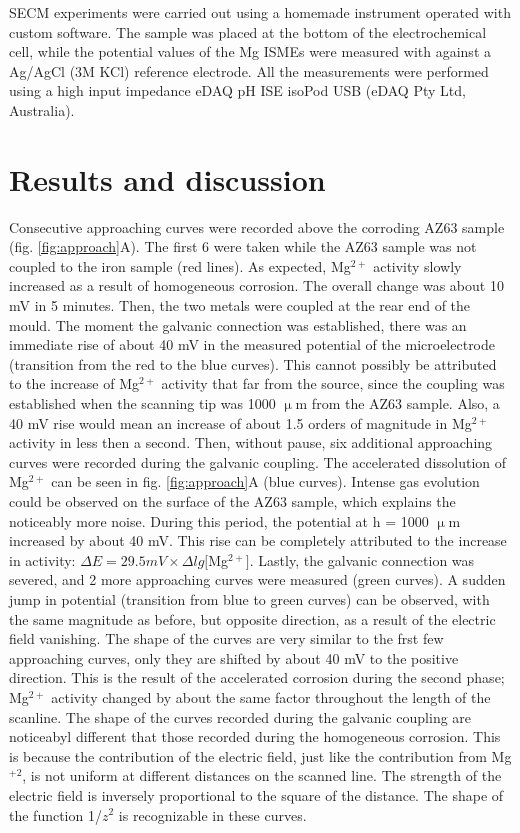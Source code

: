 \documentclass[3p]{elsarticle}
\begin{document}
SECM experiments were carried out using a homemade instrument operated with custom software. The sample was placed at the bottom of the electrochemical cell, while the potential values of the Mg ISMEs were measured with against a Ag/AgCl (3M KCl) reference electrode. All the measurements were performed using a high input impedance eDAQ pH ISE isoPod USB (eDAQ Pty Ltd, Australia).

\section{Results and discussion}

Consecutive approaching curves were recorded above the corroding AZ63 sample (fig. \ref{fig:approach}A). The first 6 were taken while the AZ63 sample was not coupled to the iron sample (red lines). As expected, Mg$^{2+}$ activity slowly increased as a result of homogeneous corrosion. The overall change was about 10 mV in 5 minutes. Then, the two metals were coupled at the rear end of the mould. The moment the galvanic connection was established, there was an immediate rise of about 40 mV in the measured potential of the microelectrode (transition from the red to the blue curves). This cannot possibly be attributed to the increase of Mg$^{2+}$ activity that far from the source, since the coupling was established when the scanning tip was 1000 $\upmu$m from the AZ63 sample. Also, a 40 mV rise would mean an increase of about 1.5 orders of magnitude in Mg$^{2+}$ activity in less then a second. Then, without pause, six additional approaching curves were recorded during the galvanic coupling. The accelerated dissolution of Mg$^{2+}$ can be seen in fig. \ref{fig:approach}A (blue curves). Intense gas evolution could be observed on the surface of the AZ63 sample, which explains the noticeably more noise. During this period, the potential at h = 1000 $\upmu$m increased by about 40 mV. This rise can be completely attributed to the increase in activity: $\Delta E = 29.5 mV \times \Delta lg[$Mg$^{2+}]$. Lastly, the galvanic connection was severed, and 2 more approaching curves were measured (green curves). A sudden jump in potential (transition from blue to green curves) can be observed, with the same magnitude as before, but opposite direction, as a result of the electric field vanishing. The shape of the curves are very similar to the frst few approaching curves, only they are shifted by about 40 mV to the positive direction. This is the result of the accelerated corrosion during the second phase; Mg$^{2+}$ activity changed by about the same factor throughout the length of the scanline. The shape of the curves recorded during the galvanic coupling are noticeabyl different that those recorded during the homogeneous corrosion. This is because the contribution of the electric field, just like the contribution from Mg$^{+2}$, is not uniform at different distances on the scanned line. The strength of the electric field is inversely proportional to the square of the distance. The shape of the function 1/$z^2$ is recognizable in these curves.
\end{document}
